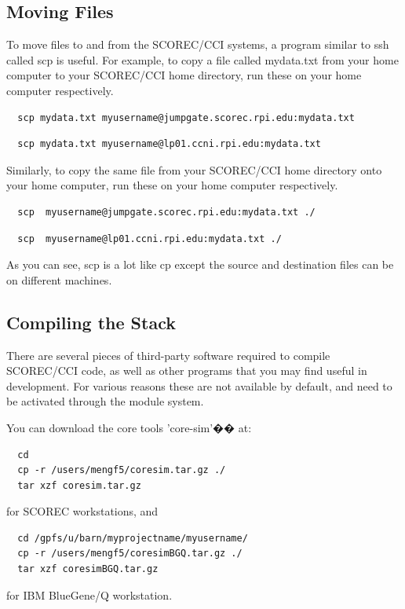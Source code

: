 \documentclass{article}
\begin{document}
\subsection{Moving Files}

To move files to and from the SCOREC/CCI systems, a program similar to ssh called scp is useful. For example, to copy a file called mydata.txt from your home computer to your SCOREC/CCI home directory, run these on your home computer respectively.
\begin{lstlisting}
  scp mydata.txt myusername@jumpgate.scorec.rpi.edu:mydata.txt
\end{lstlisting}
\begin{lstlisting}  
  scp mydata.txt myusername@lp01.ccni.rpi.edu:mydata.txt
\end{lstlisting}

Similarly, to copy the same file from your SCOREC/CCI home directory onto your home computer, run these on your home computer respectively.

\begin{lstlisting}
  scp  myusername@jumpgate.scorec.rpi.edu:mydata.txt ./
\end{lstlisting}
\begin{lstlisting}  
  scp  myusername@lp01.ccni.rpi.edu:mydata.txt ./
\end{lstlisting}  
As you can see, scp is a lot like cp except the source and destination files can be on different machines.

\subsection{Compiling the Stack}

There are several pieces of third-party software required to compile SCOREC/CCI code, as well as other programs that you may find useful in development. For various reasons these are not available by default, and need to be activated through the module system. 

You can download the core tools 'core-sim'�� at:

\begin{lstlisting}
  cd
  cp -r /users/mengf5/coresim.tar.gz ./
  tar xzf coresim.tar.gz
\end{lstlisting}
for SCOREC workstations, and 
\begin{lstlisting}
  cd /gpfs/u/barn/myprojectname/myusername/
  cp -r /users/mengf5/coresimBGQ.tar.gz ./
  tar xzf coresimBGQ.tar.gz
\end{lstlisting}
for IBM BlueGene/Q workstation.
\end{document}
